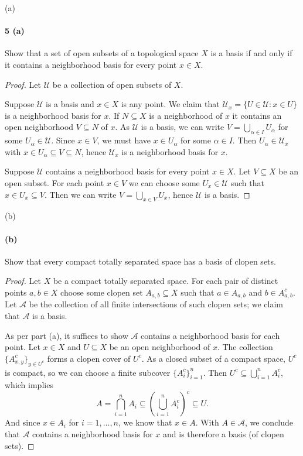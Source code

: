 \documentclass[12pt]{article}
\newlength{\myparskip}
\newenvironment{fullbox}{\begin{lrbox}{\savefullbox}\begin{minipage}{\dimexpr\textwidth-2\fboxsep\relax}\setlength{\parskip}{\myparskip}}{\end{minipage}\end{lrbox}\framebox[\textwidth]{\usebox{\savefullbox}}}
\newenvironment{pbox}[1][]{\begin{fullbox}\ifx#1\empty\else\paragraph{#1}\phantom{}\fi}{\end{fullbox}}
\theoremstyle{definition}
\newcommand{\<}{\langle}
\renewcommand{\>}{\rangle}
\renewcommand{\AA}{\mathcal{A}}
\newcommand{\UU}{\mathcal{U}}
\begin{document}
\newpage
\begin{pbox}[5 (a)]
    Show that a set of open subsets of a topological space $X$ is a basis if and only if it contains a neighborhood basis for every point $x \in X$.
\end{pbox}

\begin{proof}
    Let $\UU$ be a collection of open subsets of $X$.

    Suppose $\UU$ is a basis and $x \in X$ is any point.
    We claim that $\UU_x = \{U \in \UU : x \in U\}$ is a neighborhood basis for $x$.
    If $N \subseteq X$ is a neighborhood of $x$ it contains an open neighborhood $V \subseteq N$ of $x$.
    As $\UU$ is a basis, we can write $V = \bigcup_{\alpha \in I} U_\alpha$ for some $U_\alpha \in \UU$.
    Since $x \in V$, we must have $x \in U_\alpha$ for some $\alpha \in I$.
    Then $U_\alpha \in \UU_x$ with $x \in U_\alpha \subseteq V \subseteq N$, hence $\UU_x$ is a neighborhood basis for $x$.

    Suppose $\UU$ contains a neighborhood basis for every point $x \in X$.
    Let $V \subseteq X$ be an open subset. For each point $x \in V$ we can choose some $U_x \in \UU$ such that $x \in U_x \subseteq V$.
    Then we can write $V = \bigcup_{x \in V} U_x$, hence $\UU$ is a basis.
\end{proof}

\begin{pbox}[(b)]
    Show that every compact totally separated space has a basis of clopen sets.
\end{pbox}

\begin{proof}
    Let $X$ be a compact totally separated space.
    For each pair of distinct points $a, b \in X$ choose some clopen set $A_{a, b} \subseteq X$ such that $a \in A_{a, b}$ and $b \in A_{a, b}^c$.
    Let $\AA$ be the collection of all finite intersections of such clopen sets; we claim that $\AA$ is a basis.

    As per part (a), it suffices to show $\AA$ contains a neighborhood basis for each point.
    Let $x \in X$ and $U \subseteq X$ be an open neighborhood of $x$.
    The collection $\{A_{x, y}^c\}_{y \in U^c}$ forms a clopen cover of $U^c$.
    As a closed subset of a compact space, $U^c$ is compact, so we can choose a finite subcover $\{A_i^c\}_{i=1}^{n}$.
    Then $U^c \subseteq \bigcup_{i=1}^{n} A_i^c$, which implies
    \[\textstyle
        A
            = \bigcap_{i=1}^{n} A_i
            \subseteq \left(\bigcup_{i=1}^{n} A_i^c\right)^c
            \subseteq U.
    \]
    And since $x \in A_i$ for $i = 1, \dots, n$, we know that $x \in A$.
    With $A \in \AA$, we conclude that $\AA$ contains a neighborhood basis for $x$ and is therefore a basis (of clopen sets).
\end{proof}
\end{document}
